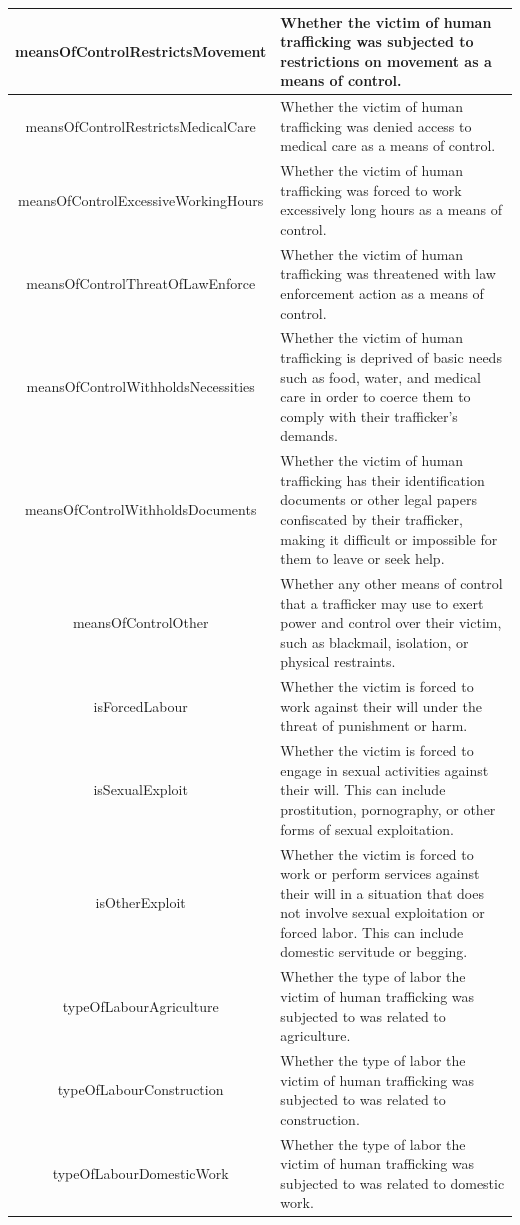 \documentclass{article} %
\begin{document}
\begin{longtable}{|c|p{8cm}|}
		\hline
		meansOfControlRestrictsMovement & Whether the victim of human trafficking was subjected to restrictions on movement as a means of control. \\
		\hline
		meansOfControlRestrictsMedicalCare & Whether the victim of human trafficking was denied access to medical care as a means of control. \\
		\hline
		meansOfControlExcessiveWorkingHours & Whether the victim of human trafficking was forced to work excessively long hours as a means of control. \\
		\hline
		meansOfControlThreatOfLawEnforce & Whether the victim of human trafficking was threatened with law enforcement action as a means of control. \\
		\hline
		meansOfControlWithholdsNecessities & Whether the victim of human trafficking is deprived of basic needs such as food, water, and medical care in order to coerce them to comply with their trafficker's demands.\\
		\hline
		meansOfControlWithholdsDocuments & Whether the victim of human trafficking has their identification documents or other legal papers confiscated by their trafficker, making it difficult or impossible for them to leave or seek help.\\
		\hline
		meansOfControlOther & Whether any other means of control that a trafficker may use to exert power and control over their victim, such as blackmail, isolation, or physical restraints.\\
		\hline
		isForcedLabour & Whether the victim is forced to work against their will under the threat of punishment or harm.\\
		\hline
		isSexualExploit & Whether the victim is forced to engage in sexual activities against their will. This can include prostitution, pornography, or other forms of sexual exploitation.\\
		\hline
		isOtherExploit & Whether the victim is forced to work or perform services against their will in a situation that does not involve sexual exploitation or forced labor. This can include domestic servitude or begging.\\
		\hline
		typeOfLabourAgriculture & Whether the type of labor the victim of human trafficking was subjected to was related to agriculture.\\
		\hline
		typeOfLabourConstruction & Whether the type of labor the victim of human trafficking was subjected to was related to construction.\\
		\hline
		typeOfLabourDomesticWork & Whether the type of labor the victim of human trafficking was subjected to was related to domestic work.\\

\end{longtable}
\end{document}
